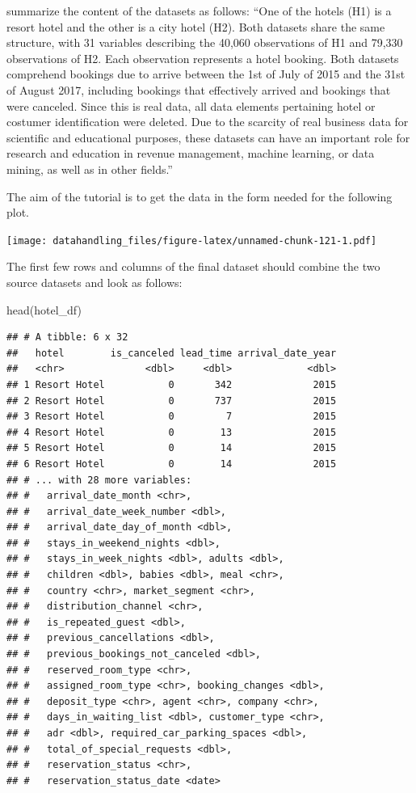 \documentclass[
  12pt,
]{style/krantz}
\newenvironment{Shaded}{\begin{snugshade}}{\end{snugshade}}
\newcommand{\FunctionTok}[1]{\textcolor[rgb]{0.00,0.00,0.00}{#1}}
\newcommand{\NormalTok}[1]{#1}
\begin{document}
\citet{nuno_etal2019} summarize the content of the datasets as follows: ``One of the hotels (H1) is a resort hotel and the other is a city hotel (H2). Both datasets share the same structure, with 31 variables describing the 40,060 observations of H1 and 79,330 observations of H2. Each observation represents a hotel booking. Both datasets comprehend bookings due to arrive between the 1st of July of 2015 and the 31st of August 2017, including bookings that effectively arrived and bookings that were canceled. Since this is real data, all data elements pertaining hotel or costumer identification were deleted. Due to the scarcity of real business data for scientific and educational purposes, these datasets can have an important role for research and education in revenue management, machine learning, or data mining, as well as in other fields.''

The aim of the tutorial is to get the data in the form needed for the following plot.

\texttt{[image: datahandling\_files/figure-latex/unnamed-chunk-121-1.pdf]}

The first few rows and columns of the final dataset should combine the two source datasets and look as follows:

\begin{Shaded}
\begin{Highlighting}[]
\FunctionTok{head}\NormalTok{(hotel\_df)}
\end{Highlighting}
\end{Shaded}

\begin{verbatim}
## # A tibble: 6 x 32
##   hotel        is_canceled lead_time arrival_date_year
##   <chr>              <dbl>     <dbl>             <dbl>
## 1 Resort Hotel           0       342              2015
## 2 Resort Hotel           0       737              2015
## 3 Resort Hotel           0         7              2015
## 4 Resort Hotel           0        13              2015
## 5 Resort Hotel           0        14              2015
## 6 Resort Hotel           0        14              2015
## # ... with 28 more variables:
## #   arrival_date_month <chr>,
## #   arrival_date_week_number <dbl>,
## #   arrival_date_day_of_month <dbl>,
## #   stays_in_weekend_nights <dbl>,
## #   stays_in_week_nights <dbl>, adults <dbl>,
## #   children <dbl>, babies <dbl>, meal <chr>,
## #   country <chr>, market_segment <chr>,
## #   distribution_channel <chr>,
## #   is_repeated_guest <dbl>,
## #   previous_cancellations <dbl>,
## #   previous_bookings_not_canceled <dbl>,
## #   reserved_room_type <chr>,
## #   assigned_room_type <chr>, booking_changes <dbl>,
## #   deposit_type <chr>, agent <chr>, company <chr>,
## #   days_in_waiting_list <dbl>, customer_type <chr>,
## #   adr <dbl>, required_car_parking_spaces <dbl>,
## #   total_of_special_requests <dbl>,
## #   reservation_status <chr>,
## #   reservation_status_date <date>
\end{verbatim}
\end{document}
